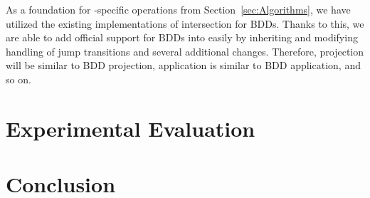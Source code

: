 As a foundation for \nft-specific operations from Section~\ref{sec:Algorithms}, we have utilized the existing implementations of intersection for BDDs.
Thanks to this, we are able to add official support for BDDs into \mata easily by inheriting \nft and modifying handling of jump transitions and several additional changes.
Therefore, \nft projection will be similar to BDD projection, \nft application is similar to BDD application, and so on.


\chapter{Experimental Evaluation}

\chapter{Conclusion}


% 
